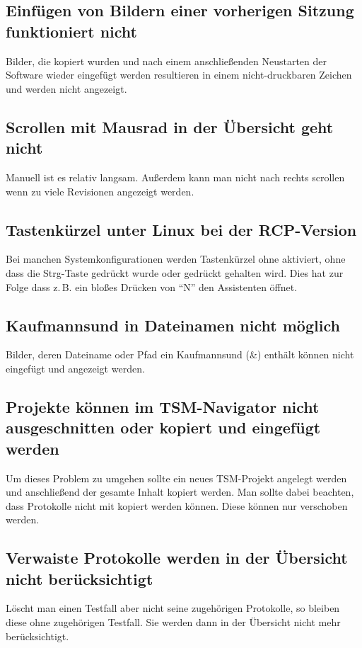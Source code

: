 \documentclass[11pt,a4paper,titlepage]{article}
\begin{document}
\subsection*{Einfügen von Bildern einer vorherigen Sitzung funktioniert nicht}
Bilder, die kopiert wurden und nach einem anschließenden Neustarten der Software wieder eingefügt werden resultieren in einem nicht-druckbaren Zeichen und werden nicht angezeigt.

\subsection*{Scrollen mit Mausrad in der Übersicht geht nicht}
Manuell ist es relativ langsam. Außerdem kann man nicht nach rechts scrollen wenn zu viele Revisionen angezeigt werden.

\subsection*{Tastenkürzel unter Linux bei der RCP-Version}
Bei manchen Systemkonfigurationen werden Tastenkürzel ohne aktiviert, ohne dass die Strg-Taste gedrückt wurde oder gedrückt gehalten wird.
Dies hat zur Folge dass z.\,B. ein bloßes Drücken von "`N"' den Assistenten öffnet.

\subsection*{Kaufmannsund in Dateinamen nicht möglich}
Bilder, deren Dateiname oder Pfad ein Kaufmannsund (\&) enthält können nicht eingefügt und angezeigt werden.

\subsection*{Projekte können im TSM-Navigator nicht ausgeschnitten oder kopiert und eingefügt werden}
Um dieses Problem zu umgehen sollte ein neues TSM-Projekt angelegt werden und anschließend der gesamte Inhalt kopiert werden.
Man sollte dabei beachten, dass Protokolle nicht mit kopiert werden können. Diese können nur verschoben werden.

\subsection*{Verwaiste Protokolle werden in der Übersicht nicht berücksichtigt}
Löscht man einen Testfall aber nicht seine zugehörigen Protokolle, so bleiben diese ohne zugehörigen Testfall. Sie werden dann in der Übersicht nicht mehr berücksichtigt.
\end{document}
